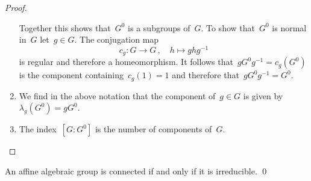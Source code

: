 \begin{proof}
\begin{enumerate}
      Together this shows that~$G^0$ is a subgroups of~$G$.
      To show that~$G^0$ is normal in~$G$ let~$g \in G$.
      The conjugation map
      \[
                c_g
        \colon  G
        \to     G \,,
        \quad   h
        \mapsto g h g^{-1}
      \]
      is regular and therefore a homeomorphism.
      It follows that~$g G^0 g^{-1} = c_g(G^0)$ is the component containing~$c_g(1) = 1$ and therefore that~$g G^0 g^{-1} = G^0$.
    \item
      We find in the above notation that the component of~$g \in G$ is given by~$\lambda_g( G^0 ) = g G^0$.
    \item
      The index~$[G : G^0]$ is the number of components of~$G$.
    \qedhere
  \end{enumerate}
\end{proof}


\begin{corollary}
  An affine algebraic group is connected if and only if it is irreducible.
  \qed
\end{corollary}





